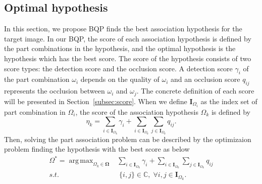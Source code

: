 \documentclass[10pt,twocolumn,letterpaper]{article}
\DeclareMathOperator*{\argmax}{arg\,max}
\begin{document}
\subsection{Optimal hypothesis}
\label{subsec:optimal_hypothesis}
In this section, we propose BQP finds the best association hypothesis for the target image.
In our BQP, the score of each association hypothesis is defined by the part combinations in the hypothesis, and the optimal hypothesis is the hypothesis which has the best score.
The score of the hypothesis consists of two score types: the detection score and the occlusion score.
A detection score $\gamma_i$ of the part combination $\omega_i$ depends on the quality of $\omega_i$ and an occlusion score $q_{ij}$ represents the occlusion between $\omega_i$ and $\omega_j$.
The concrete definition of each score will be presented in Section~\ref{subsec:score}.
When we define $\mathbf{I}_{\Omega_i}$ as the index set of part combination in $\Omega_i$, the score of the association hypothesis $\Omega_k$ is defined by
\begin{equation}
   \label{eq:hypothesis_score}
   \eta_k = \sum_{i \in \mathbf{I}_{\Omega_k}} \gamma_i + \sum_{i \in \mathbf{I}_{\Omega_k}}\sum_{j \in \mathbf{I}_{\Omega_k}} q_{ij}.
\end{equation}
Then, solving the part association problem can be described by the optimizaion problem finding the hypothesis with the best score as below
\begin{equation}
   \label{eq:pedestrian_optimization}
   \begin{aligned}
      \Omega^* = \argmax_{\Omega_k \in \mathbf{\Omega}} & \sum_{i \in \mathbf{I}_{\Omega_k}} \gamma_i + \sum_{i \in \mathbf{I}_{\Omega_k}} \sum_{j \in \mathbf{I}_{\Omega_k}} q_{ij}\\
                 s.t. & \; \{i, j\} \in \mathbb{C}, \; \forall i,j \in \mathbf{I}_{\Omega_k}.
   \end{aligned}
\end{equation}
\end{document}
